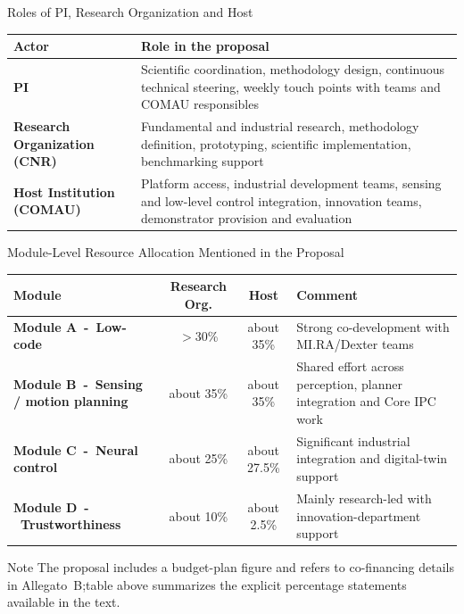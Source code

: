 \documentclass[aspectratio=169,10pt]{beamer}
\begin{document}
\begin{frame}{Roles of PI, Research Organization and Host}

\small
\begin{tabularx}{\textwidth}{>{\bfseries}p{} X}
\toprule
Actor & Role in the proposal \\
\midrule
PI & Scientific coordination, methodology design, continuous technical steering, weekly touch points with teams and COMAU responsibles \\
Research Organization (CNR) & Fundamental and industrial research, methodology definition, prototyping, scientific implementation, benchmarking support \\
Host Institution (COMAU) & Platform access, industrial development teams, sensing and low-level control integration, innovation teams, demonstrator provision and evaluation \\
\bottomrule
\end{tabularx}

\end{frame}


\begin{frame}{Module-Level Resource Allocation Mentioned in the Proposal}

\small
\begin{tabularx}{\textwidth}{>{\bfseries}p{} c c X}
\toprule
Module & Research Org. & Host & Comment \\
\midrule
Module A~-~Low-code & $>$30\% & about 35\% & Strong co-development with MI.RA/Dexter teams \\
Module B~-~Sensing / motion planning & about 35\% & about 35\% & Shared effort across perception, planner integration and Core IPC work \\
Module C~-~Neural control & about 25\% & about 27.5\% & Significant industrial integration and digital-twin support \\
Module D~-~Trustworthiness & about 10\% & about 2.5\% & Mainly research-led with innovation-department support \\
\bottomrule
\end{tabularx}
\begin{block}{Note}
The proposal includes a budget-plan figure and refers to co-financing details in Allegato~B;\@the table above summarizes the explicit percentage statements available in the text.
\end{block}

\end{frame}
\end{document}
